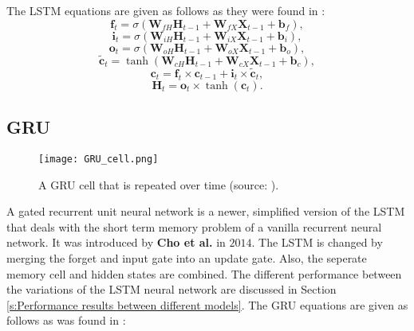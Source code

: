 The LSTM equations are given as follows as they were found in \cite{Teuwen2019}:
\begin{equation}\label{LSTM_forget}
	\textbf{f}_{t} = \sigma(\textbf{W}_{fH}\textbf{H}_{t-1}+\textbf{W}_{fX}\textbf{X}_{t-1}+\textbf{b}_{f}),
\end{equation}
\begin{equation}\label{LSTM_input}
	\textbf{i}_{t} = \sigma(\textbf{W}_{iH}\textbf{H}_{t-1}+\textbf{W}_{iX}\textbf{X}_{t-1}+\textbf{b}_{i}),
\end{equation}
\begin{equation}\label{LSTM_output}
	\textbf{o}_{t} = \sigma(\textbf{W}_{oH}\textbf{H}_{t-1}+\textbf{W}_{oX}\textbf{X}_{t-1}+\textbf{b}_{o}),
\end{equation}
\begin{equation}\label{LSTM_rnn}
	\tilde{\textbf{c}}_{t} = \tanh(\textbf{W}_{cH}\textbf{H}_{t-1}+\textbf{W}_{cX}\textbf{X}_{t-1}+\textbf{b}_{c}),
\end{equation}
\begin{equation}\label{LSTM_memory}
	\textbf{c}_t = \textbf{f}_t\times\textbf{c}_{t-1}+\textbf{i}_t\times\tilde{\textbf{c}}_t,
\end{equation}
\begin{equation}\label{LSTM_next}
	\textbf{H}_t = \textbf{o}_t\times\tanh(\textbf{c}_t).
\end{equation}


\subsection{GRU}\label{s:GRU}

\begin{figure}[ht]
	\centering
	\texttt{[image: GRU\_cell.png]}
	\caption{A GRU cell that is repeated over time (source: \cite{Olah}).}
	\label{fig:GRU_cell}
\end{figure}
A gated recurrent unit neural network is a newer, simplified version of the LSTM that deals with the short term memory problem of a vanilla recurrent neural network. It was introduced by \textbf{Cho et al.} in $ 2014 $. The LSTM is changed by merging the forget and input gate into an update gate. Also, the seperate memory cell and hidden states are combined. The different performance between the variations of the LSTM neural network are discussed in Section \ref{s:Performance results between different models}. The GRU equations are given as follows as was found in \cite{Teuwen2019}:

